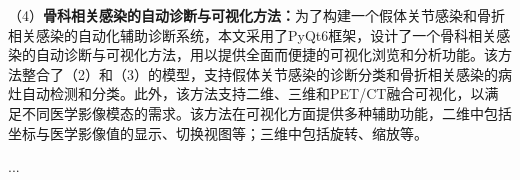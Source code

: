 \begin{cabstract}
    （4）\textbf{骨科相关感染的自动诊断与可视化方法：}为了构建一个假体关节感染和骨折相关感染的自动化辅助诊断系统，本文采用了PyQt6框架，设计了一个骨科相关感染的自动诊断与可视化方法，用以提供全面而便捷的可视化浏览和分析功能。该方法整合了（2）和（3）的模型，支持假体关节感染的诊断分类和骨折相关感染的病灶自动检测和分类。此外，该方法支持二维、三维和PET/CT融合可视化，以满足不同医学影像模态的需求。该方法在可视化方面提供多种辅助功能，二维中包括坐标与医学影像值的显示、切换视图等；三维中包括旋转、缩放等。

\end{cabstract}


\begin{eabstract}
    ...
\end{eabstract}

